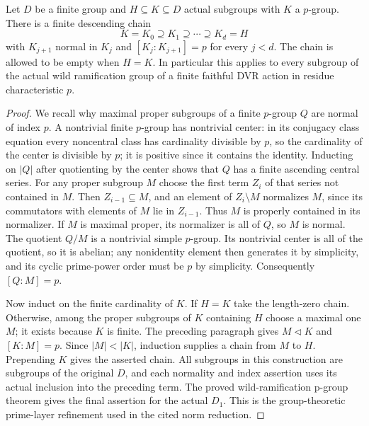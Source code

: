 \begin{lemma}
\label{fw:relative-prime-subgroup-chain}
\leanok
Let $D$ be a finite group and $H\subseteq K\subseteq D$ actual
subgroups with $K$ a $p$-group. There is a finite descending chain
\[
 K=K_0\supseteq K_1\supseteq\cdots\supseteq K_d=H
\]
with $K_{j+1}$ normal in $K_j$ and $[K_j:K_{j+1}]=p$
for every $j<d$. The chain is allowed to be empty when $H=K$.
In particular this applies to every subgroup of the actual wild
ramification group of a finite faithful DVR action in residue
characteristic $p$.
\end{lemma}
\begin{proof}
We recall why maximal proper subgroups of a finite $p$-group $Q$
are normal of index $p$. A nontrivial finite $p$-group has
nontrivial center: in its conjugacy class equation every noncentral
class has cardinality divisible by $p$, so the cardinality of the
center is divisible by $p$; it is positive since it contains the
identity. Inducting on $|Q|$ after quotienting by the center shows
that $Q$ has a finite ascending central series. For any proper
subgroup $M$ choose the first term $Z_i$ of that series not contained
in $M$. Then $Z_{i-1}\subseteq M$, and an element of
$Z_i\setminus M$ normalizes $M$, since its commutators with elements
of $M$ lie in $Z_{i-1}$. Thus $M$ is properly contained in its
normalizer. If $M$ is maximal proper, its normalizer is all of $Q$,
so $M$ is normal. The quotient $Q/M$ is a nontrivial simple
$p$-group. Its nontrivial center is all of the quotient, so it is
abelian; any nonidentity element then generates it by simplicity,
and its cyclic prime-power order must be $p$ by simplicity.
Consequently $[Q:M]=p$.

Now induct on the finite cardinality of $K$. If $H=K$ take the
length-zero chain. Otherwise, among the proper subgroups of $K$
containing $H$ choose a maximal one $M$; it exists because $K$
is finite. The preceding paragraph gives $M\triangleleft K$ and
$[K:M]=p$. Since $|M|<|K|$, induction supplies a chain from
$M$ to $H$. Prepending $K$ gives the asserted chain. All subgroups
in this construction are subgroups of the original $D$, and each
normality and index assertion uses its actual inclusion into the
preceding term. The proved wild-ramification p-group theorem gives
the final assertion for the actual $D_1$. This is the group-theoretic
prime-layer refinement used in the cited norm reduction.
\end{proof}

